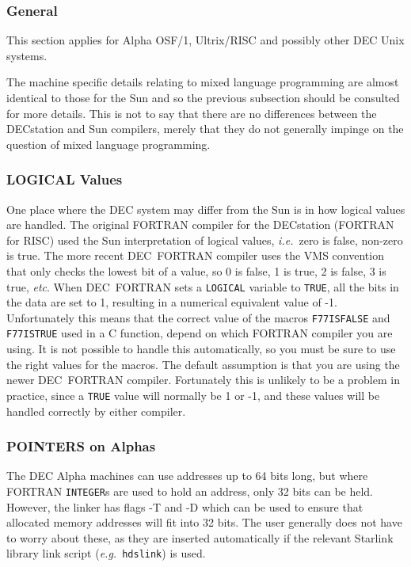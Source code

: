 \documentclass[twoside,11pt]{article}
\newcommand{\htmlref}[2]{#1}
\renewcommand{\_}{\texttt{\symbol{95}}}
\begin{document}
\subsubsection{General}
This section applies for Alpha OSF/1, Ultrix/RISC and possibly other DEC
Unix systems.

The machine specific details relating to mixed language programming are
almost identical to those for the Sun and so the previous subsection should be
consulted for more details. This is not to say that there are no differences
between the DECstation and Sun compilers, merely that they do not generally
impinge on the question of mixed language programming.

\subsubsection{LOGICAL Values}
One place where the DEC system may differ from the Sun is in how logical
values are handled. The original FORTRAN compiler for the DECstation (FORTRAN
for RISC) used the Sun interpretation of logical values, \textit{i.e.}\ zero is 
false, non-zero is true. The more recent DEC~FORTRAN compiler uses the VMS
convention that only checks the lowest bit of a value, so 0 is false, 1 is
true, 2 is false, 3 is true, \textit{etc}. 
When DEC~FORTRAN sets a \texttt{LOGICAL} variable to \texttt{TRUE}, all the 
bits in the data are set to 1, resulting in a numerical equivalent value of -1. 
Unfortunately this means that the correct value of the
macros 
\htmlref{\texttt{F77\_ISFALSE}}{F77_ISFALSE}
and
\htmlref{\texttt{F77\_ISTRUE}}{F77_ISTRUE}
used in a C function, depend on which FORTRAN compiler you are using. 
It is not possible to handle this
automatically, so you must be sure to use the right values for the macros. The
default assumption is that you are using the newer DEC~FORTRAN compiler.
Fortunately this is unlikely to be a problem in practice,
since a \texttt{TRUE} value will normally be 1 or -1, and these values will be
handled correctly by either compiler.

\subsubsection{POINTERS on Alphas}
The DEC Alpha machines can use addresses up to 64 bits long, but where
FORTRAN \texttt{INTEGER}s are used to hold an address, only 32 bits
can be held.  However, the linker has flags -T and -D which can be
used to ensure that allocated memory addresses will fit into 32
bits. The user generally does not have to worry about these, as they
are inserted automatically if the relevant Starlink library link
script (\textit{e.g.}\ \texttt{hds\_link}) is used.
\end{document}
